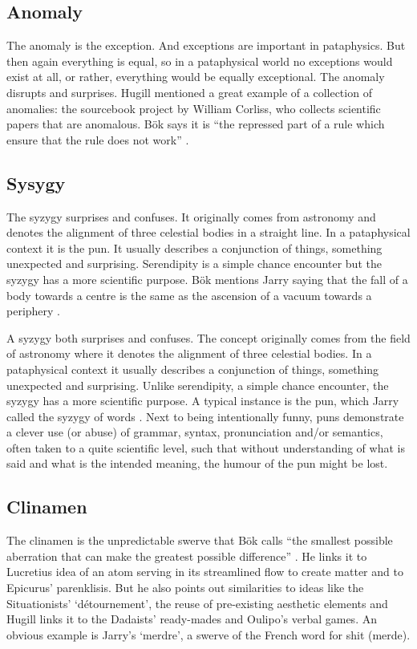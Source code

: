 \subsection{Anomaly}

The anomaly is the exception. And exceptions are important in pataphysics. But then again everything is equal, so in a pataphysical world no exceptions would exist at all, or rather, everything would be equally exceptional. The anomaly disrupts and surprises. Hugill mentioned a great example of a collection of anomalies: the sourcebook project by William Corliss, who collects scientific papers that are anomalous. Bök says it is ``the repressed part of a rule which ensure that the rule does not work'' \citep[p.38]{Bok2002}.


\subsection{Sysygy}

The syzygy surprises and confuses. It originally comes from astronomy and denotes the alignment of three celestial bodies in a straight line. In a pataphysical context it is the pun. It usually describes a conjunction of things, something unexpected and surprising. Serendipity is a simple chance encounter but the syzygy has a more scientific purpose. Bök mentions Jarry saying that the fall of a body towards a centre is the same as the ascension of a vacuum towards a periphery \citep[p.42]{Bok2002}.

A syzygy both surprises and confuses. The concept originally comes from the field of astronomy where it denotes the alignment of three celestial bodies. In a pataphysical context it usually describes a conjunction of things, something unexpected and surprising. Unlike serendipity, a simple chance encounter, the syzygy has a more scientific purpose. A typical instance is the pun, which Jarry called the syzygy of words \citep{Jarry1996}. Next to being intentionally funny, puns demonstrate a clever use (or abuse) of grammar, syntax, pronunciation and/or semantics, often taken to a quite scientific level, such that without understanding of what is said and what is the intended meaning, the humour of the pun might be lost.


\subsection{Clinamen}

The clinamen is the unpredictable swerve that Bök calls ``the smallest possible aberration that can make the greatest possible difference''  \citep[p.43]{Bok2002}. He links it to Lucretius idea of an atom serving in its streamlined flow to create matter and to Epicurus' parenklisis. But he also points out similarities to ideas like the Situationists' `détournement', the reuse of pre-existing aesthetic elements and Hugill links it to the Dadaists' ready-mades and Oulipo's verbal games. An obvious example is Jarry's `merdre', a swerve of the French word for shit (merde).

